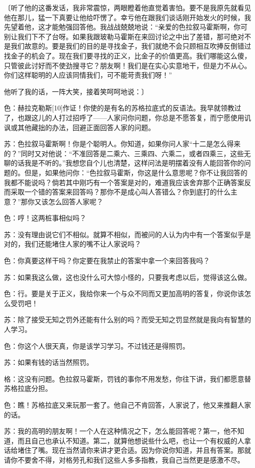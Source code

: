 \documentclass[12pt,oneside]{book}
\begin{document}
〔听了他的这番发话，我非常震惊，两眼瞪着他直觉着害怕。要不是我原先就看见他在那儿，猛一下真要让他给吓愣了。幸亏他在跟我们谈话刚开始发火的时候，我先望着他，这才能勉强回答他。我战战兢兢地说：“亲爱的色拉叙马霍斯啊，你可别让我们下不了台呀。如果我跟玻勒马霍斯在来回讨论之中出了差错，那可绝对不是我们故意的。要是我们的目的是寻找金子，我们就绝不会只顾相互吹捧反倒错过找金子的机会了。现在我们要寻找的正义，比金子的价值更高。我们哪能这么傻，只管彼此讨好而不使劲搜寻它？朋友啊！我们是在实心实意地干，但是力不从心。你们这样聪明的人应该同情我们，可不能苛责我们呀！”

他听了我的话，一阵大笑，接着笑呵呵地说：〕

色：赫拉克勒斯[10]作证！你使的是有名的苏格拉底式的反语法。我早就领教过了，也跟这儿的人打过招呼了——人家问你问题，你总是不愿答复，而宁愿使用讥讽或其他藏拙的办法，回避正面回答人家的问题。

苏：色拉叙马霍斯啊！你是个聪明人。你知道，如果你问人家“十二是怎么得来的？”同时又对他说：“不准回答是二乘六、三乘四、六乘二，或者四乘三，这些无聊的话我是不听的。”我想您自个儿也清楚，这样问法是明摆着没有人能回答你的问题的。但是，如果他问你：“色拉叙马霍斯，你这是什么意思呢？你不让我回答的我都不能说吗？倘若其中刚巧有一个答案是对的，难道我应该舍弃那个正确答案反而采取一个错的答案来回答吗？那你不是成心叫人答错么？你到底打的什么主意？”那你又该怎么回答人家呢？

色：哼！这两桩事相似吗？

苏：没有理由说它们不相似。就算不相似，而被问的人认为内中有一个答案似乎是对的，我们还能堵住人家的嘴不让人家说吗？

色：你真要这样干吗？你定要在我禁止的答案中拿一个来回答我吗？

苏：如果我这么做，这也没什么可大惊小怪的，只要我考虑以后，觉得该这么做。

色：行。要是关于正义，我给你来一个与众不同而又更加高明的答复，你说你该怎么受罚吧！

苏：除了接受无知之罚外还能有什么别的吗？而受无知之罚显然就是我向有智慧的人学习。

色：你这个人很天真，你是该学习学习。不过钱还是得照罚。

苏：如果有钱的话当然照罚。

格：这没有问题。色拉叙马霍斯，罚钱的事你不用发愁，你往下讲，我们都愿意替苏格拉底分担。

色：瞧！苏格拉底又来玩那一套了。他自己不肯回答，人家说了，他又来推翻人家的话。

苏：我的高明的朋友啊！一个人在这种情况之下，怎么能回答呢？第一，他不知道，而且自己也承认不知道。第二，就算他想说些什么吧，也让一个有权威的人拿话给堵住了嘴。现在当然请你来讲才更合适。因为你说你知道，并且有答案。那就请你不要舍不得，对格劳孔和我们这些人多多指教，我自己当然更是感激不尽。
\end{document}
